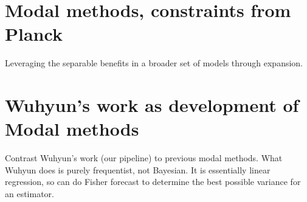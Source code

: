     \section{Modal methods, constraints from Planck}
    Leveraging the separable benefits in a broader set of models through expansion.
\newpage
    \section{Wuhyun's work as development of Modal methods}
    Contrast Wuhyun's work (our pipeline) to previous modal methods.
    What Wuhyun does is purely frequentist, not Bayesian. It is essentially linear regression, so can do Fisher forecast to determine
    the best possible variance for an estimator.
    

